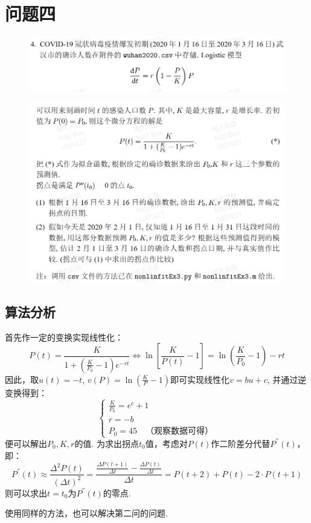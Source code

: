 \documentclass[UTF8,ctexart,a4paper,11pt,openany]{article}
\theoremstyle{definition}
\begin{document}
\section{问题四}
    \begin{figure}[H]
        \centering
        \includegraphics[width=\linewidth]{pics/7pro4.1.png}
        \end{figure}
    \begin{figure}[H]
        \centering
        \includegraphics[width=\linewidth]{pics/7pro4.2.png}
        \end{figure}
    \subsection{算法分析}
    首先作一定的变换实现线性化：$$P(t)=\frac{K}{1+\left(\frac{K}{P_{0}}-1\right) e^{-r t}} \Leftrightarrow \ln [\frac{K}{P(t)}-1]=\ln (\frac{K}{P_0}-1)-rt$$因此，取$u(t)=-t$, $v(P)=\ln (\frac{K}{P}-1)$即可实现线性化$v=bu+c$, 并通过逆变换得到：$$\left\{\begin{array}{l}
        \frac{K}{P_0}=e^c+1 \\
        r=-b \\
        P_0=45 \quad \text{（观察数据可得）}
        \end{array}\right.$$
    便可以解出$P_0,K,r$的值. 为求出拐点$t_0$值，考虑对$P(t)$作二阶差分代替$P^{''}(t)$，即：$$P^{''}(t)\approx \frac{\Delta^2 P(t)}{{(\Delta t)}^2}=\frac{\frac{\Delta P(t+1)}{\Delta t}-\frac{\Delta P(t)}{\Delta t}}{\Delta t}=P(t+2)+P(t)-2\cdot P(t+1)$$则可以求出$t=t_0$为$P^{''}(t)$的零点. \par 使用同样的方法，也可以解决第二问的问题.
\end{document}
